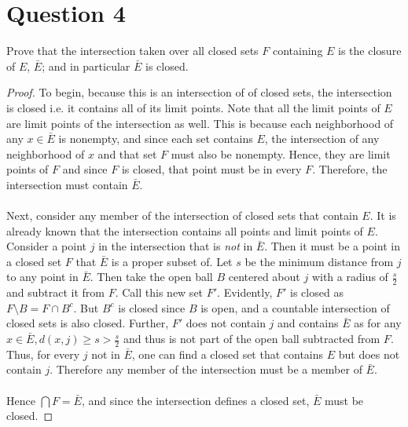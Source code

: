 \documentclass[12pt, letterpaper]{article}
\begin{document}
\section*{Question 4}
Prove that the intersection taken over all closed sets $F$ containing $E$ is the closure of $E$, $\bar E$; and in particular $\bar E$ is closed.
\begin{proof}
  To begin, because this is an intersection of of closed sets, the intersection is closed i.e. it contains all of its limit points.
  Note that all the limit points of $E$ are limit points of the intersection as well. This is because each neighborhood of any $x \in \bar E$ is nonempty, and since each set contains
  $E$, the intersection of any neighborhood of $x$ and that set $F$ must also be nonempty. Hence, they are limit points of $F$ and since $F$ is closed, that point must be in every $F$.
  Therefore, the intersection must contain $\bar E$.\\
  \\
  Next, consider any member of the intersection of closed sets that contain $E$. It is already known that the intersection contains all points and limit points of $E$. Consider a point $j$
  in the intersection that is \textit{not} in $\bar E$. Then it must be a point in a closed set $F$ that $\bar E$ is a proper subset of. Let $s$ be the minimum distance from $j$ to any
  point in $\bar E$. Then take the open ball $B$ centered about $j$ with a radius of $\frac{s}{2}$ and subtract it from $F$. Call this new set $F'$. Evidently, $F'$ is closed as
  $F \setminus B = F \cap B^c$. But $B^c$ is closed since $B$ is open, and a countable intersection of closed sets is also closed. Further, $F'$ does not contain $j$ and contains
  $\bar E$ as for any $x \in \bar E, d(x, j) \geq s > \frac{s}{2}$ and thus is not part of the open ball subtracted from $F$. Thus, for every $j$ not in $\bar E$, one can find a
  closed set that contains $E$ but does not contain $j$. Therefore any member of the intersection must be a member of $\bar E$.\\
  \\
  Hence $\bigcap F = \bar E$, and since the intersection defines a closed set, $\bar E$ must be closed.
\end{proof}
\pagebreak
\end{document}

